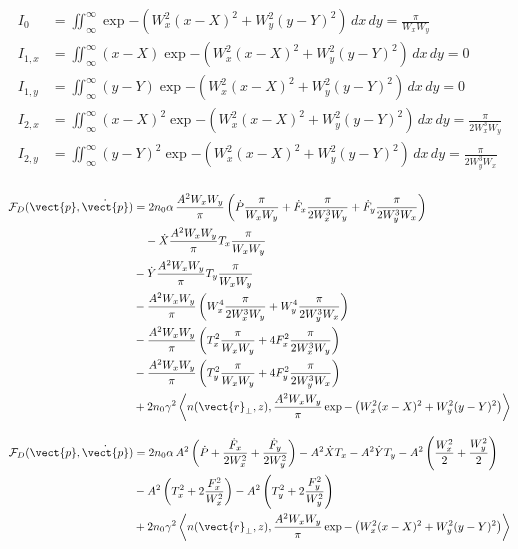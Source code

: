 \begin{equation}
    \begin{split}
       I_0 &= \iint^{\infty}_{\infty} \exp{-\left( W_x^2(x-X)^2 + W_y^2(y-Y)^2 \right)} \, dx \,dy =   \frac{\pi}{W_{x}W_{y}}\\
       I_{1,x} &= \iint^{\infty}_{\infty} (x-X) \exp{-\left( W_x^2(x-X)^2 + W_y^2(y-Y)^2 \right)} \, dx \,dy = 0\\
       I_{1,y} &= \iint^{\infty}_{\infty} (y-Y) \exp{-\left( W_x^2(x-X)^2 + W_y^2(y-Y)^2 \right)} \, dx \,dy = 0\\
       I_{2,x} &= \iint^{\infty}_{\infty} (x-X)^2 \exp{-\left( W_x^2(x-X)^2 + W_y^2(y-Y)^2 \right)} \, dx \,dy = \frac{\pi}{2W_{x}^3W_{y}}\\
       I_{2,y} &= \iint^{\infty}_{\infty} (y-Y)^2 \exp{-\left( W_x^2(x-X)^2 + W_y^2(y-Y)^2 \right)} \, dx \,dy = \frac{\pi}{2W_{y}^3W_{x}}\\
    \end{split}
\end{equation}


\begin{equation}
    \begin{split}
    \mathcal{F}_{D}(\vect{p},\dot{\vect{p}}) & = 2 n_0 \alpha\, \frac{A^2W_x W_y}{\pi} \left(\dot{P} \frac{\pi}{W_{x}W_{y}}  + \dot{F}_{x} \frac{\pi}{2W_{x}^3W_{y}} + \dot{F}_{y} \frac{\pi}{2W_{y}^3W_{x}} \right) \\
        &\quad - \dot{X} \frac{A^2W_x W_y}{\pi} T_x \frac{\pi}{W_{x}W_{y}} \\
&- \dot{Y}\frac{A^2W_x W_y}{\pi} T_y \frac{\pi}{W_{x}W_{y}} \\ 
        &- \frac{A^2W_x W_y}{\pi}\left(W_x^4 \frac{\pi}{2W_{x}^3W_{y}} +  W_y^4 \frac{\pi}{2W_{y}^3W_{x}}\right) \\
        &- \frac{A^2W_x W_y}{\pi}\left(T_x^2 \frac{\pi}{W_{x}W_{y}}  + 4 F_{x}^2 \frac{\pi}{2W_{x}^3W_{y}}\right) \\
        &- \frac{A^2W_x W_y}{\pi}\left(T_y^2 \frac{\pi}{W_{x}W_{y}}  + 4 F_{y}^2 \frac{\pi}{2W_{y}^3W_{x}}\right) \\
        &+ 2n_0 \gamma^2 \left<n(\vect{r}_{\perp},z), \frac{A^2W_x W_y}{\pi} \exp{-\left( W_x^2(x-X)^2 + W_y^2(y-Y)^2 \right)}\right>
    \end{split}
\end{equation}

\begin{equation}
    \begin{split}
    \mathcal{F}_{D}(\vect{p},\dot{\vect{p}}) & = 2 n_0 \alpha\, A^2 \left(\dot{P}  + \frac{\dot{F}_{x} }{2W_{x}^2} + \frac{\dot{F}_{y}}{2W_{y}^2} \right) - A^2 \dot{X}  T_x - A^2  \dot{Y} T_y  - A^2 \left( \frac{W_x^2}{2} +   \frac{W_y^2}{2}\right) \\
        &- A^2 \left(T_x^2 + 2  \frac{F_{x}^2}{W_{x}^2}\right) - A^2 \left(T_y^2 + 2 \frac{F_{y}^2}{W_{y}^2}\right) \\
        &+ 2n_0 \gamma^2 \left<n(\vect{r}_{\perp},z), \frac{A^2W_x W_y}{\pi} \exp{-\left( W_x^2(x-X)^2 + W_y^2(y-Y)^2 \right)}\right>
    \end{split}
\end{equation}


